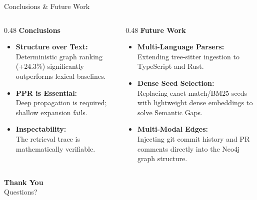 \documentclass[aspectratio=169]{beamer}
\begin{document}
\begin{frame}{Conclusions \& Future Work}
  \begin{columns}[T]
    \begin{column}{0.48\textwidth}
      \textbf{\large Conclusions}\\[0.3cm]
      \begin{itemize}
        \setlength\itemsep{1em}
        \item \textbf{Structure over Text:}\\Deterministic graph ranking (+24.3\%) significantly outperforms lexical baselines.
        \item \textbf{PPR is Essential:}\\Deep propagation is required; shallow expansion fails.
        \item \textbf{Inspectability:}\\The retrieval trace is mathematically verifiable.
      \end{itemize}
    \end{column}
    
    \begin{column}{0.48\textwidth}
      \textbf{\large Future Work}\\[0.3cm]
      \begin{itemize}
        \setlength\itemsep{1em}
        \item \textbf{Multi-Language Parsers:}\\Extending tree-sitter ingestion to TypeScript and Rust.
        \item \textbf{Dense Seed Selection:}\\Replacing exact-match/BM25 seeds with lightweight dense embeddings to solve Semantic Gaps.
        \item \textbf{Multi-Modal Edges:}\\Injecting git commit history and PR comments directly into the Neo4j graph structure.
      \end{itemize}
    \end{column}
  \end{columns}
\end{frame}

\begin{frame}
  \centering
  \vspace{1cm}
  {\Huge \textcolor{PrimaryTeal}{\textbf{Thank You}}}\\
  \vspace{1cm}
  {\Large Questions?}
\end{frame}
\end{document}
